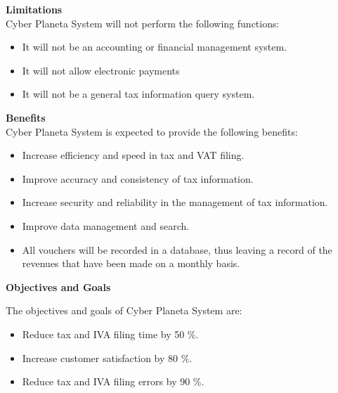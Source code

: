 \documentclass[12pt,a4paper, twosite]{article}
\begin{document}
\textbf{Limitations}
\\
Cyber Planeta System will not perform the following functions:
\begin{itemize}
    \item It will not be an accounting or financial management system.
     \item It will not allow electronic payments
     \item It will not be a general tax information query system.
\end{itemize}

\textbf{Benefits}
\\
Cyber Planeta System is expected to provide the following benefits:
\begin{itemize}
    \item Increase efficiency and speed in tax and VAT filing.
    \item Improve accuracy and consistency of tax information.
    \item Increase security and reliability in the management of tax information.
    \item Improve data management and search. 
    \item All vouchers will be recorded in a database, thus leaving a record of the revenues that have been made on a monthly basis. 
\end{itemize}


\textbf{Objectives and Goals}

The objectives and goals of Cyber Planeta System are:
\begin{itemize}
    \item Reduce tax and IVA filing time by 50 \%.
    \item Increase customer satisfaction by 80 \%.
    \item Reduce tax and IVA filing errors by 90 \%.    
\end{itemize}
\end{document}
